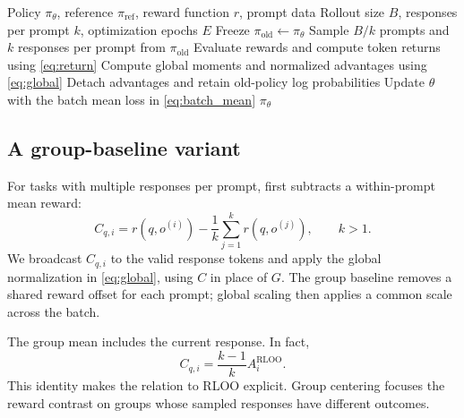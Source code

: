 \begin{algorithm}[t]
\caption{REINFORCE++ with $k\geq1$ responses per prompt}
\label{algo:main}
\begin{algorithmic}[1]
\Require Policy $\pi_\theta$, reference $\pi_{\mathrm{ref}}$, reward function $r$, prompt data
\Require Rollout size $B$, responses per prompt $k$, optimization epochs $E$
 \State Freeze $\pi_{\mathrm{old}}\gets\pi_\theta$
 \State Sample $B/k$ prompts and $k$ responses per prompt from $\pi_{\mathrm{old}}$
 \State Evaluate rewards and compute token returns using \cref{eq:return}
 \State Compute global moments and normalized advantages using \cref{eq:global}
 \State Detach advantages and retain old-policy log probabilities
   \State Update $\theta$ with the batch mean loss in \cref{eq:batch_mean}
  \EndFor
 \EndFor
\EndFor
\State \Return $\pi_\theta$
\end{algorithmic}
\end{algorithm}

\subsection{A group-baseline variant}
\label{sec:baseline}
For tasks with multiple responses per prompt, \baseline first subtracts a within-prompt mean reward:
\begin{equation}
 C_{q,i}=r(q,o^{(i)})-\frac{1}{k}\sum_{j=1}^{k}r(q,o^{(j)}),
 \qquad k>1.
 \label{eq:group_center}
\end{equation}
We broadcast $C_{q,i}$ to the valid response tokens and apply the global normalization in \cref{eq:global}, using $C$ in place of $G$. The group baseline removes a shared reward offset for each prompt; global scaling then applies a common scale across the batch.

The group mean includes the current response. In fact,
\begin{equation}
 C_{q,i}=\frac{k-1}{k}A_i^{\mathrm{RLOO}}.
 \label{eq:rloo_relation}
\end{equation}
This identity makes the relation to RLOO explicit. Group centering focuses the reward contrast on groups whose sampled responses have different outcomes.

